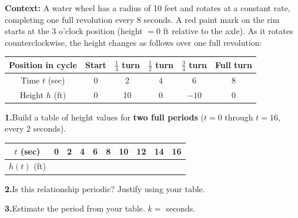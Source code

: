 \documentclass[10pt]{article}
\begin{document}
\begin{tcolorbox}[colback=white, colframe=black!40,
    title=\textbf{Tier A --- Apply},
    fonttitle=\bfseries, arc=2mm, left=3mm, right=3mm, top=2mm, bottom=2mm]

\textbf{Context:} A water wheel has a radius of 10 feet and rotates at a
constant rate, completing one full revolution every 8 seconds. A red paint
mark on the rim starts at the 3 o'clock position (height $= 0$ ft relative
to the axle). As it rotates counterclockwise, the height changes as follows
over one full revolution:

\vspace{4pt}
\begin{center}
\renewcommand{\arraystretch}{1.35}
\begin{tabular}{|c|c|c|c|c|c|}
\hline
Position in cycle & Start & $\tfrac{1}{4}$ turn & $\tfrac{1}{2}$ turn & $\tfrac{3}{4}$ turn & Full turn \\
\hline
Time $t$ (sec) & 0 & 2 & 4 & 6 & 8 \\
\hline
Height $h$ (ft) & 0 & 10 & 0 & $-10$ & 0 \\
\hline
\end{tabular}
\end{center}

\vspace{6pt}
\textbf{1.}\quad Build a table of height values for \textbf{two full periods}
($t = 0$ through $t = 16$, every 2 seconds).

\vspace{4pt}
\begin{center}
\renewcommand{\arraystretch}{1.5}
\begin{tabular}{|c|c|c|c|c|c|c|c|c|c|}
\hline
$t$ (sec) & 0 & 2 & 4 & 6 & 8 & 10 & 12 & 14 & 16 \\
\hline
$h(t)$ (ft) & & & & & & & & & \\
\hline
\end{tabular}
\end{center}

\vspace{6pt}
\textbf{2.}\quad Is this relationship periodic? Justify using your table.

\vspace{4pt}
\textbf{3.}\quad Estimate the period from your table. $k =$ \underline{\hspace{1.5cm}} seconds.


\end{tcolorbox}
\end{document}
